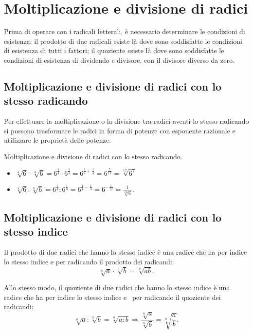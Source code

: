 \section{Moltiplicazione e divisione di radici}
\label{sec:radici_moltiplicazione}

Prima di operare con i radicali letterali, è necessario determinare le 
condizioni di esistenza: il prodotto di due radicali esiste là dove sono 
soddisfatte le condizioni di esistenza di tutti i fattori; 
il quoziente esiste là dove sono soddisfatte le condizioni di esistenza di 
dividendo e divisore, con il divisore diverso da zero.

\subsection{Moltiplicazione e divisione di radici con lo stesso radicando}
Per effettuare la moltiplicazione o la divisione tra radici aventi lo stesso 
radicando si possono trasformare le radici in forma di potenze con esponente 
razionale e utilizzare le proprietà delle potenze.

\begin{exrig}
 \begin{esempio}
Moltiplicazione e divisione di radici con lo stesso radicando.
\begin{itemize}
\item $\sqrt[4]6\cdot \sqrt[3]6=6^{\frac 1 4}\cdot 6^{\frac 1 3}=
       6^{\frac 1 4+\frac 1 3}=6^{\frac 7{12}}=\sqrt[12]{6^7}$
\item $\sqrt[4]6:\sqrt[3]6=6^{\frac 1 4}:6^{\frac 1 3}=
       6^{\frac 1 4-\frac 1 3}=6^{-\frac 1{12}}=\frac 1{\sqrt[12]6}$.
\end{itemize}
 \end{esempio}
\end{exrig}

\subsection{Moltiplicazione e divisione di radici con lo stesso indice}
Il prodotto di due radici che hanno lo stesso indice è una radice che ha per 
indice lo stesso indice e per radicando il prodotto dei radicandi:
\[\sqrt[n]a\cdot \sqrt[n]b=\sqrt[n]{ab}.\]

Allo stesso modo, il quoziente di due radici che hanno lo stesso indice è una 
radice che ha per indice lo stesso indice e \ per radicando il quoziente dei 
radicandi:
\[\sqrt[n]a:\sqrt[n]b=\sqrt[n]{a:b} \Rightarrow \dfrac{\sqrt[n]a}{\sqrt[n]b}=
  \sqrt[n]{\dfrac a b}.\]

